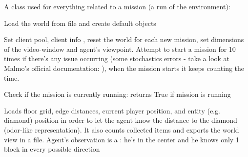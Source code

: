 \documentclass[letterpaper,10pt,english]{sphinxmanual}
\begin{document}
\begin{fulllineitems}
\label{\detokenize{index:mission.mission}}
A class used for everything related to a mission (a run of the environment):

\begin{fulllineitems}
\label{\detokenize{index:mission.mission.load}}
Load the world from  file and create default  objects

\end{fulllineitems}


\begin{fulllineitems}
\label{\detokenize{index:mission.mission.start}}
Set client pool, client info , reset the world for each new mission, set dimensions
of the video-window and agent’s viewpoint. Attempt to start a mission for 10 times if there’s any
issue occurring (some stochastics errors - take a look at Malmo’s official documentation:
 ), when the mission starts it keeps counting the time.

\end{fulllineitems}


\begin{fulllineitems}
\label{\detokenize{index:mission.mission.is_running}}
Check if the mission is currently running:
returns True if mission is running

\end{fulllineitems}


\begin{fulllineitems}
\label{\detokenize{index:mission.mission.get_observation}}
Loads floor grid, edge distances, current player position, and entity (e.g. diamond) position
in order to let the agent know the distance to the diamond (odor-like representation).
It also counts collected items and exports the world view in a  file.
Agent’s observation is a : he’s in the center and he knows only 1 block in every
possible direction


\end{fulllineitems}
\end{fulllineitems}
\end{document}
